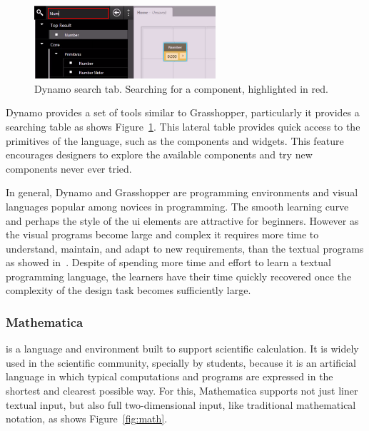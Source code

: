 \begin{figure}
  \vspace{-10pt}
  \begin{center}
    \includegraphics[width=0.6\textwidth]{img/dynam-tab}
  \end{center}
  \vspace{-20pt}
 \caption{Dynamo search tab. Searching for a component, highlighted in red.}  
  \vspace{-15pt}
    \label{fig:dynam}
\end{figure}

Dynamo provides a set of tools similar to Grasshopper, particularly it provides a searching table as shows Figure~\ref{fig:dynam}. This lateral table provides quick access to the primitives of the language, such as the components and widgets. This feature encourages designers to explore the available components and try new components never ever tried.  

In general, Dynamo and Grasshopper are programming environments and visual languages popular among novices in programming. The smooth learning curve and perhaps the style of the \ac{ui} elements are attractive for beginners. However as the visual programs become large and complex it requires more time to understand, maintain, and adapt to new requirements, than the textual programs as showed in~\cite{leitao2011programming}. Despite of spending more time and effort to learn a textual programming language, the learners have their time quickly recovered once the complexity of the design task becomes sufficiently large.

\subsubsection{Mathematica~\cite{wolfram1991mathematica}} is a language and environment built to support scientific calculation. It is widely used in the scientific community, specially by students, because it is an artificial language in which typical computations and programs are expressed in the shortest and clearest possible way. For this, Mathematica supports not just liner textual input, but also full two-dimensional input, like traditional mathematical notation, as shows Figure~\ref{fig:math}.

